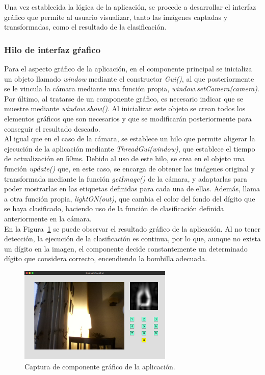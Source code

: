 Una vez establecida la lógica de la aplicación, se procede a desarrollar el interfaz gráfico que permite al usuario visualizar, tanto las imágenes captadas y transformadas, como el resultado de la clasificación.

\subsubsection{Hilo de interfaz gŕafico}
Para el aspecto gráfico de la aplicación, en el componente principal se inicializa un objeto llamado \textit{window} mediante el constructor \textit{Gui()}, al que posteriormente se le vincula la cámara mediante una función propia, \textit{window.setCamera(camera)}. Por último, al tratarse de un componente gráfico, es necesario indicar que se muestre mediante \textit{window.show()}. Al inicializar este objeto se crean todos los elementos gráficos que son necesarios y que se modificarán posteriormente para conseguir el resultado deseado.\\

Al igual que en el caso de la cámara, se establece un hilo que permite aligerar la ejecución de la aplicación mediante \textit{ThreadGui(window)}, que establece el tiempo de actualización en 50ms. Debido al uso de este hilo, se crea en el objeto una función \textit{update()} que, en este caso, se encarga de obtener las imágenes original y transformada mediante la función \textit{getImage()} de la cámara, y adaptarlas para poder mostrarlas en las etiquetas definidas para cada una de ellas. Además, llama a otra función propia, \textit{lightON(out)}, que cambia el color del fondo del dígito que se haya clasificado, haciendo uso de la función de clasificación definida anteriormente en la cámara.\\

En la Figura~\ref{fig.gui} se puede observar el resultado gráfico de la aplicación. Al no tener detección, la ejecución de la clasificación es continua, por lo que, aunque no exista un dígito en la imagen, el componente decide constantemente un determinado dígito que considera correcto, encendiendo la bombilla adecuada.

\begin{figure}[H]
	\begin{center}
		\includegraphics[width=0.65\textwidth]{figures/gui}
		\caption{Captura de componente gráfico de la aplicación.}
		\label{fig.gui}
	\end{center}
\end{figure}

